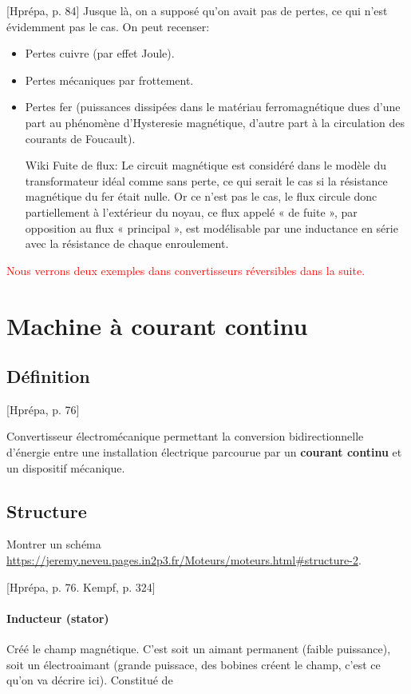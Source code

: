 \documentclass[11pt]{report}
\numberwithin{figure}{section}
\numberwithin{equation}{section}
\numberwithin{table}{section}
\newcommand{\1}{\boldsymbol{1}}
\begin{document}
[Hprépa, p. 84] Jusque là, on a supposé qu'on avait pas de pertes, ce qui n'est évidemment pas le cas. On peut recenser:

\begin{itemize}
\item Pertes cuivre (par effet Joule).
\item Pertes mécaniques par frottement.
\item Pertes fer (puissances dissipées dans le matériau ferromagnétique dues
d'une part au phénomène d'Hysteresie magnétique, d'autre part à la circulation des courants de Foucault).
\item [Wiki] Fuite de flux: Le circuit magnétique est considéré dans le modèle du transformateur idéal comme sans perte, ce qui serait le cas si la résistance magnétique du fer était nulle. Or ce n'est pas le cas, le flux circule donc partiellement à l'extérieur du noyau, ce flux appelé « de fuite », par opposition au flux « principal », est modélisable par une inductance en série avec la résistance de chaque enroulement.
\end{itemize}

\textcolor{red}{Nous verrons deux exemples dans convertisseurs réversibles dans la suite.}


\section{Machine à courant continu}

\subsection{Définition}

[Hprépa, p. 76]

Convertisseur électromécanique permettant la conversion bidirectionnelle d'énergie entre une installation électrique parcourue par un \textbf{courant continu} et un dispositif mécanique.

\subsection{Structure}

Montrer un schéma \url{https://jeremy.neveu.pages.in2p3.fr/Moteurs/moteurs.html#structure-2}. 

[Hprépa, p. 76. Kempf, p. 324]


\paragraph*{Inducteur (stator)} Créé le champ magnétique. C'est soit un aimant permanent (faible puissance), soit un électroaimant (grande puissace, des bobines créent le champ, c'est ce qu'on va décrire ici). Constitué de
\end{document}
